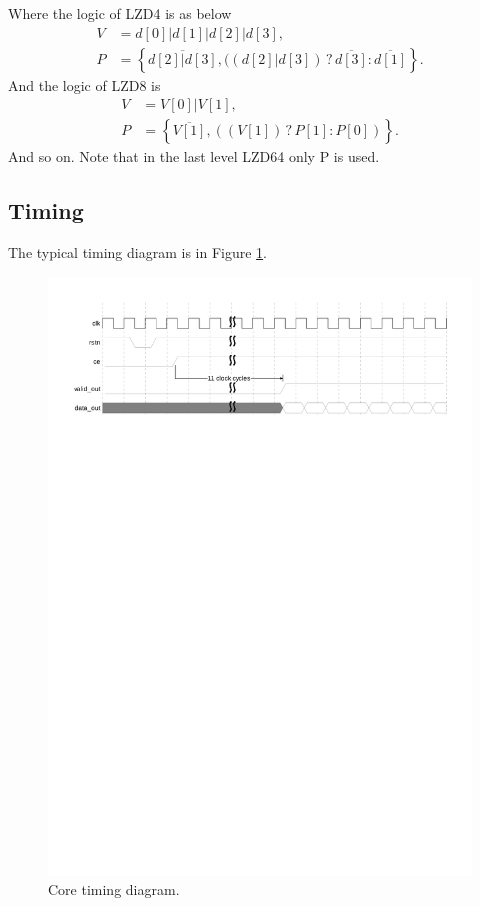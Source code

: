 \documentclass[a4paper, titlepage]{article}
\begin{document}
Where the logic of \textsf{LZD4} is as below
\begin{align}
    V &= d[0] | d[1] | d[2] | d[3], \\
    P &= \left\{ \overline{d[2] | d[3]},
        ((d[2] | d[3]) \,?\, \overline{d[3]} : \overline{d[1]} \right\}.
\end{align}
And the logic of \textsf{LZD8} is
\begin{align}
    V &= V[0] | V[1], \\
    P &= \left\{ \overline{V[1]}, ((V[1]) \,?\, P[1] : P[0]) \right\}.
\end{align}
And so on. Note that in the last level \textsf{LZD64} only \textsf{P} is used.

\subsection{Timing}
The typical timing diagram is in Figure \ref{fig:coretiming}.
\begin{figure}[!htbp]
\centering
\includegraphics[scale=0.6]{coretiming.pdf}
\caption{Core timing diagram.}
\label{fig:coretiming}
\end{figure}
\end{document}

